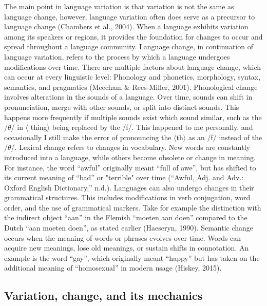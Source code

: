 The main point in language variation is that variation is not the same as language change, however, language variation often does serve as a precursor to language change (Chambers et al., 2004). When a language exhibits variation among its speakers or regions, it provides the foundation for changes to occur and spread throughout a language community. Language change, in continuation of language variation, refers to the process by which a language undergoes modifications over time. There are multiple factors about language change, which can occur at every linguistic level: Phonology and phonetics, morphology, syntax, semantics, and pragmatics (Meecham \& Rees-Miller, 2001). Phonological change involves alterations in the sounds of a language. Over time, sounds can shift in pronunciation, merge with other sounds, or split into distinct sounds. This happens more frequently if multiple sounds exist which sound similar, such as the /$\theta$/ in $\langle$ thing$\rangle$ being replaced by the /f/. This happened to me personally, and occasionally I still make the error of pronouncing the $\langle$th$\rangle$ as an /f/ instead of the /$\theta$/. Lexical change refers to changes in vocabulary. New words are constantly introduced into a language, while others become obsolete or change in meaning. For instance, the word “awful” originally meant “full of awe”, but has shifted to its current meaning of “bad” or "terrible" over time (“Awful, Adj. and Adv.: Oxford English Dictionary,” n.d.). Languages can also undergo changes in their grammatical structures. This includes modifications in verb conjugation, word order, and the use of grammatical markers. Take for example the distinction with the indirect object “aan” in the Flemish “moeten aan doen” compared to the Dutch “aan moeten doen”, as stated earlier (Haeseryn, 1990). Semantic change occurs when the meaning of words or phrases evolves over time. Words can acquire new meanings, lose old meanings, or sustain shifts in connotation. An example is the word “gay”, which originally meant “happy” but has taken on the additional meaning of “homosexual” in modern usage (Hiskey, 2015). 

\subsection{Variation, change, and its mechanics}

